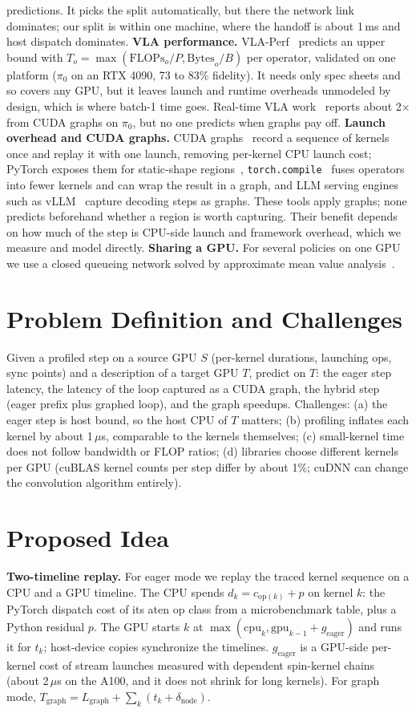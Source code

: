 \documentclass[10pt,twocolumn]{article}
\begin{document}
predictions. It picks the split automatically, but there the network link dominates; our split
is within one machine, where the handoff is about 1\,ms and host dispatch dominates.
\textbf{VLA performance.} VLA-Perf~\cite{vlaperf} predicts an upper bound with
$T_o = \max(\mathrm{FLOPs}_o/P, \mathrm{Bytes}_o/B)$ per operator, validated on one platform
($\pi_0$ on an RTX 4090, 73 to 83\% fidelity). It needs only spec sheets and so covers any GPU,
but it leaves launch and runtime overheads unmodeled by design, which is where batch-1 time
goes. Real-time VLA work~\cite{realtime} reports about
2$\times$ from CUDA graphs on $\pi_0$, but no one predicts when graphs pay off.
\textbf{Launch overhead and CUDA graphs.} CUDA graphs~\cite{cudagraphs} record a sequence of
kernels once and replay it with one launch, removing per-kernel CPU launch cost; PyTorch
exposes them for static-shape regions~\cite{ptgraphs}, \texttt{torch.compile}~\cite{pytorch2}
fuses operators into fewer kernels and can wrap the result in a graph, and LLM serving engines
such as vLLM~\cite{vllm} capture decoding steps as graphs. These tools apply graphs; none
predicts beforehand whether a region is worth capturing. Their benefit depends on how much of
the step is CPU-side launch and framework overhead, which we measure and model directly.
\textbf{Sharing a GPU.} For several policies on one GPU we use a closed queueing network solved
by approximate mean value analysis~\cite{mva,schweitzer}.

\section{Problem Definition and Challenges}
Given a profiled step on a source GPU $S$ (per-kernel durations, launching ops, sync points)
and a description of a target GPU $T$, predict on $T$: the eager step latency, the latency of
the loop captured as a CUDA graph, the hybrid step (eager prefix plus graphed loop), and the
graph speedups. Challenges: (a) the eager step is host bound, so the host CPU of $T$ matters;
(b) profiling inflates each kernel by about 1\,$\mu$s, comparable to the kernels themselves;
(c) small-kernel time does not follow bandwidth or FLOP ratios; (d) libraries choose different
kernels per GPU (cuBLAS kernel counts per step differ by about 1\%; cuDNN can change the
convolution algorithm entirely).

\section{Proposed Idea}
\textbf{Two-timeline replay.} For eager mode we replay the traced kernel sequence on a CPU and
a GPU timeline. The CPU spends $d_k = c_{\mathrm{op}(k)} + p$ on kernel $k$: the PyTorch
dispatch cost of its aten op class from a microbenchmark table, plus a Python residual $p$.
The GPU starts $k$ at $\max(\mathrm{cpu}_k, \mathrm{gpu}_{k-1} + g_{\mathrm{eager}})$ and runs
it for $t_k$; host-device copies synchronize the timelines. $g_{\mathrm{eager}}$ is a GPU-side
per-kernel cost of stream launches measured with dependent spin-kernel chains (about
2\,$\mu$s on the A100, and it does not shrink for long kernels). For graph mode,
$T_{\mathrm{graph}} = L_{\mathrm{graph}} + \sum_k (t_k + \delta_{\mathrm{node}})$.
\end{document}
